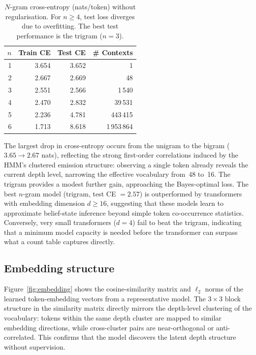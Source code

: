 \documentclass[11pt]{article}
\begin{document}
\begin{table}[htbp]
  \centering
  \begin{tabular}{r r r r}
    \toprule
    $n$ & Train CE & Test CE & \# Contexts \\
    \midrule
    1 & 3.654 & 3.652 &           1 \\
    2 & 2.667 & 2.669 &          48 \\
    3 & 2.551 & 2.566 &       1\,540 \\
    4 & 2.470 & 2.832 &      39\,531 \\
    5 & 2.236 & 4.781 &     443\,415 \\
    6 & 1.713 & 8.618 &   1\,953\,864 \\
    \bottomrule
  \end{tabular}
  \caption{$N$-gram cross-entropy (nats/token) without regularisation.  For $n \geq 4$, test loss diverges due to overfitting.  The best test performance is the trigram ($n = 3$).}
  \label{tab:ngram}
\end{table}

The largest drop in cross-entropy occurs from the unigram to the bigram ($3.65 \to 2.67$ nats), reflecting the strong first-order correlations induced by the HMM's clustered emission structure: observing a single token already reveals the current depth level, narrowing the effective vocabulary from~48 to~16.  The trigram provides a modest further gain, approaching the Bayes-optimal loss.  The best $n$-gram model (trigram, test CE $= 2.57$) is outperformed by transformers with embedding dimension $d \ge 16$, suggesting that these models learn to approximate belief-state inference beyond simple token co-occurrence statistics.  Conversely, very small transformers ($d = 4$) fail to beat the trigram, indicating that a minimum model capacity is needed before the transformer can surpass what a count table captures directly.

\subsection{Embedding structure}

Figure~\ref{fig:embedding} shows the cosine-similarity matrix and $\ell_2$ norms of the learned token-embedding vectors from a representative model.  The $3 \times 3$ block structure in the similarity matrix directly mirrors the depth-level clustering of the vocabulary: tokens within the same depth cluster are mapped to similar embedding directions, while cross-cluster pairs are near-orthogonal or anti-correlated.  This confirms that the model discovers the latent depth structure without supervision.
\end{document}
